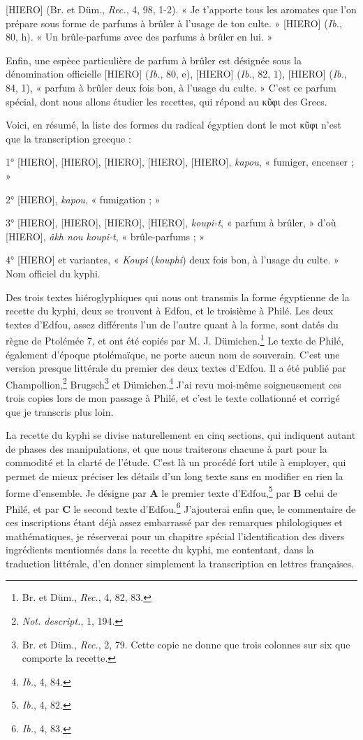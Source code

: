 \documentclass[a4paper, 11pt, oneside]{article}
\begin{document}
[HIERO] (Br. et Düm., \emph{Rec.}, 4, 98, 1-2). « Je t'apporte tous les aromates que l'on prépare sous forme de parfums à brûler à l'usage de ton culte. » [HIERO] (\emph{Ib.}, 80, h). « Un brûle-parfums avec des parfums à brûler en lui. »

Enfin, une espèce particulière de parfum à brûler est désignée sous la dénomination officielle [HIERO] (\emph{Ib.}, 80, e), [HIERO] (\emph{Ib.}, 82, 1), [HIERO] (\emph{Ib.}, 84, 1), « parfum à brûler deux fois bon, à l'usage du culte. » C'est ce parfum spécial, dont nous allons étudier les recettes, qui répond au κῦφι des Grecs.

Voici, en résumé, la liste des formes du radical égyptien dont le mot κῦφι n'est que la transcription grecque :

1° [HIERO], [HIERO], [HIERO], [HIERO], [HIERO], \emph{kapou}, « fumiger, encenser ; »

2° [HIERO], \emph{kapou}, « fumigation ; »

3° [HIERO], [HIERO], [HIERO], [HIERO], \emph{koupi-t}, « parfum à brûler, » d'où [HIERO], \emph{âkh nou koupi-t}, « brûle-parfums ; »

4° [HIERO] et variantes, « \emph{Koupi} (\emph{kouphi}) deux fois bon, à l'usage du culte. » Nom officiel du kyphi.

Des trois textes hiéroglyphiques qui nous ont transmis la forme égyptienne de la recette du kyphi, deux se trouvent à Edfou, et le troisième à Philé. Les deux textes d'Edfou, assez différents l'un de l'autre quant à la forme, sont datés du règne de Ptolémée 7, et ont été copiés par M. J. Dümichen.\footnote{Br. et Düm., \emph{Rec.}, 4, 82, 83.} Le texte de Philé, également d'époque ptolémaïque, ne porte aucun nom de souverain. C'est une version presque littérale du premier des deux textes d'Edfou. Il a été publié par Champollion,\footnote{\emph{Not. descript.}, 1, 194.} Brugsch\footnote{Br. et Düm., \emph{Rec.}, 2, 79. Cette copie ne donne que trois colonnes sur six que comporte la recette.} et Dümichen.\footnote{\emph{Ib.}, 4, 84.} J'ai revu moi-même soigneusement ces trois copies lors de mon passage à Philé, et c'est le texte collationné et corrigé que je transcris plus loin.

La recette du kyphi se divise naturellement en cinq sections, qui indiquent autant de phases des manipulations, et que nous traiterons chacune à part pour la commodité et la clarté de l'étude. C'est là un procédé fort utile à employer, qui permet de mieux préciser les détails d'un long texte sans en modifier en rien la forme d'ensemble. Je désigne par \textbf{A} le premier texte d'Edfou,\footnote{\emph{Ib.}, 4, 82.} par \textbf{B} celui de Philé, et par \textbf{C} le second texte d'Edfou.\footnote{\emph{Ib.}, 4, 83.} J'ajouterai enfin que, le commentaire de ces inscriptions étant déjà assez embarrassé par des remarques philologiques et mathématiques, je réserverai pour un chapitre spécial l'identification des divers ingrédients mentionnés dans la recette du kyphi, me contentant, dans la traduction littérale, d'en donner simplement la transcription en lettres françaises.
\clearpage
\end{document}
